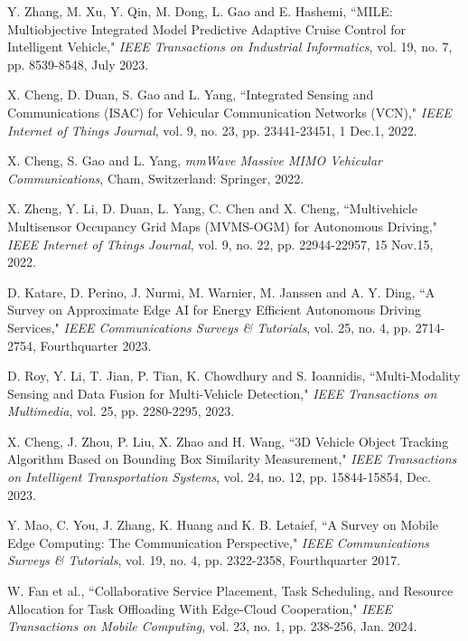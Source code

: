 \documentclass[lettersize,journal]{IEEEtran}
\begin{document}
\begin{thebibliography}{10}


Y. Zhang, M. Xu, Y. Qin, M. Dong, L. Gao and E. Hashemi, ``MILE: Multiobjective Integrated Model Predictive Adaptive Cruise Control for Intelligent Vehicle," \textit{IEEE Transactions on Industrial Informatics}, vol. 19, no. 7, pp. 8539-8548, July 2023.

X. Cheng, D. Duan, S. Gao and L. Yang, ``Integrated Sensing and Communications (ISAC) for Vehicular Communication Networks (VCN)," \textit{IEEE Internet of Things Journal}, vol. 9, no. 23, pp. 23441-23451, 1 Dec.1, 2022.

X. Cheng, S. Gao and L. Yang, \textit{mmWave Massive MIMO Vehicular Communications}, Cham, Switzerland: Springer, 2022.


X. Zheng, Y. Li, D. Duan, L. Yang, C. Chen and X. Cheng, ``Multivehicle Multisensor Occupancy Grid Maps (MVMS-OGM) for Autonomous Driving," \textit{IEEE Internet of Things Journal}, vol. 9, no. 22, pp. 22944-22957, 15 Nov.15, 2022.


D. Katare, D. Perino, J. Nurmi, M. Warnier, M. Janssen and A. Y. Ding, ``A Survey on Approximate Edge AI for Energy Efficient Autonomous Driving Services," \textit{IEEE Communications Surveys \& Tutorials}, vol. 25, no. 4, pp. 2714-2754, Fourthquarter 2023.


D. Roy, Y. Li, T. Jian, P. Tian, K. Chowdhury and S. Ioannidis, ``Multi-Modality Sensing and Data Fusion for Multi-Vehicle Detection," \textit{IEEE Transactions on Multimedia}, vol. 25, pp. 2280-2295, 2023.

X. Cheng, J. Zhou, P. Liu, X. Zhao and H. Wang, ``3D Vehicle Object Tracking Algorithm Based on Bounding Box Similarity Measurement," \textit{IEEE Transactions on Intelligent Transportation Systems}, vol. 24, no. 12, pp. 15844-15854, Dec. 2023.

Y. Mao, C. You, J. Zhang, K. Huang and K. B. Letaief, ``A Survey on Mobile Edge Computing: The Communication Perspective," \textit{IEEE Communications Surveys \& Tutorials}, vol. 19, no. 4, pp. 2322-2358, Fourthquarter 2017.

W. Fan et al., ``Collaborative Service Placement, Task Scheduling, and Resource Allocation for Task Offloading With Edge-Cloud Cooperation," \textit{IEEE Transactions on Mobile Computing}, vol. 23, no. 1, pp. 238-256, Jan. 2024.


\end{thebibliography}
\end{document}
